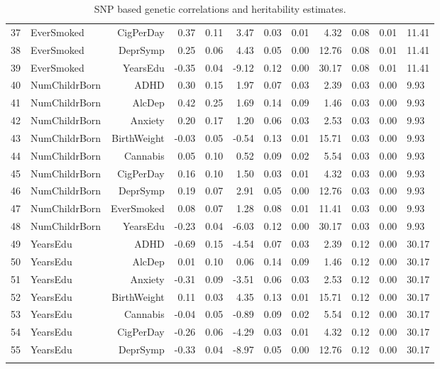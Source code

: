 \begin{longtable}{llrrrrrrrrr}
  37 & EverSmoked & CigPerDay & 0.37 & 0.11 & 3.47 & 0.03 & 0.01 & 4.32 & 0.08 & 0.01 & 11.41 \\ 
  38 & EverSmoked & DeprSymp & 0.25 & 0.06 & 4.43 & 0.05 & 0.00 & 12.76 & 0.08 & 0.01 & 11.41 \\ 
  39 & EverSmoked & YearsEdu & -0.35 & 0.04 & -9.12 & 0.12 & 0.00 & 30.17 & 0.08 & 0.01 & 11.41 \\ 
  40 & NumChildrBorn & ADHD & 0.30 & 0.15 & 1.97 & 0.07 & 0.03 & 2.39 & 0.03 & 0.00 & 9.93 \\ 
  41 & NumChildrBorn & AlcDep & 0.42 & 0.25 & 1.69 & 0.14 & 0.09 & 1.46 & 0.03 & 0.00 & 9.93 \\ 
  42 & NumChildrBorn & Anxiety & 0.20 & 0.17 & 1.20 & 0.06 & 0.03 & 2.53 & 0.03 & 0.00 & 9.93 \\ 
  43 & NumChildrBorn & BirthWeight & -0.03 & 0.05 & -0.54 & 0.13 & 0.01 & 15.71 & 0.03 & 0.00 & 9.93 \\ 
  44 & NumChildrBorn & Cannabis & 0.05 & 0.10 & 0.52 & 0.09 & 0.02 & 5.54 & 0.03 & 0.00 & 9.93 \\ 
  45 & NumChildrBorn & CigPerDay & 0.16 & 0.10 & 1.50 & 0.03 & 0.01 & 4.32 & 0.03 & 0.00 & 9.93 \\ 
  46 & NumChildrBorn & DeprSymp & 0.19 & 0.07 & 2.91 & 0.05 & 0.00 & 12.76 & 0.03 & 0.00 & 9.93 \\ 
  47 & NumChildrBorn & EverSmoked & 0.08 & 0.07 & 1.28 & 0.08 & 0.01 & 11.41 & 0.03 & 0.00 & 9.93 \\ 
  48 & NumChildrBorn & YearsEdu & -0.23 & 0.04 & -6.03 & 0.12 & 0.00 & 30.17 & 0.03 & 0.00 & 9.93 \\ 
  49 & YearsEdu & ADHD & -0.69 & 0.15 & -4.54 & 0.07 & 0.03 & 2.39 & 0.12 & 0.00 & 30.17 \\ 
  50 & YearsEdu & AlcDep & 0.01 & 0.10 & 0.06 & 0.14 & 0.09 & 1.46 & 0.12 & 0.00 & 30.17 \\ 
  51 & YearsEdu & Anxiety & -0.31 & 0.09 & -3.51 & 0.06 & 0.03 & 2.53 & 0.12 & 0.00 & 30.17 \\ 
  52 & YearsEdu & BirthWeight & 0.11 & 0.03 & 4.35 & 0.13 & 0.01 & 15.71 & 0.12 & 0.00 & 30.17 \\ 
  53 & YearsEdu & Cannabis & -0.04 & 0.05 & -0.89 & 0.09 & 0.02 & 5.54 & 0.12 & 0.00 & 30.17 \\ 
  54 & YearsEdu & CigPerDay & -0.26 & 0.06 & -4.29 & 0.03 & 0.01 & 4.32 & 0.12 & 0.00 & 30.17 \\ 
  55 & YearsEdu & DeprSymp & -0.33 & 0.04 & -8.97 & 0.05 & 0.00 & 12.76 & 0.12 & 0.00 & 30.17 \\ 
  \hline
\caption{SNP based genetic correlations and heritability estimates.} 
\end{longtable}
